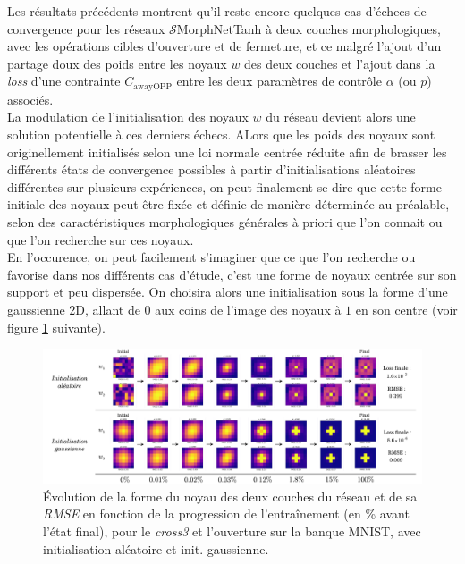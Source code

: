 Les résultats précédents montrent qu'il reste encore quelques cas d'échecs de convergence pour les réseaux $\mathcal{S}$MorphNetTanh à deux couches morphologiques, avec les opérations cibles d'ouverture et de fermeture, et ce malgré l'ajout d'un partage doux des poids entre les noyaux $w$ des deux couches et l'ajout dans la \textit{loss} d'une contrainte $C_\text{awayOPP}$ entre les deux paramètres de contrôle $\alpha$ (ou $p$) associés. \\

\vspace{-1.4mm}
\noindent La modulation de l'initialisation des noyaux $w$ du réseau devient alors une solution potentielle à ces derniers échecs. ALors que les poids des noyaux sont originellement initialisés selon une loi normale centrée réduite afin de brasser les différents états de convergence possibles à partir d'initialisations aléatoires différentes sur plusieurs expériences, on peut finalement se dire que cette forme initiale des noyaux peut être fixée et définie de manière déterminée au préalable, selon des caractéristiques morphologiques générales à priori que l'on connait ou que l'on recherche sur ces noyaux. \\

\vspace{-1.4mm}
\noindent En l'occurence, on peut facilement s'imaginer que ce que l'on recherche ou favorise dans nos différents cas d'étude, c'est une forme de noyaux centrée sur son support et peu dispersée. On choisira alors une initialisation sous la forme d'une gaussienne 2D, allant de $0$ aux coins de l'image des noyaux à $1$ en son centre (voir figure \ref{fig:init_gauss} suivante). \\


\vspace{-1.0mm}
\begin{figure}[htp]
  \begin{center}
    \includegraphics[width=1.00\linewidth]{parts/3-contributions/D-modulation_de_l_initialisation/figures/k_gauss.pdf}
    \vspace{-4.0mm}
    \caption{ \centering Évolution de la forme du noyau des deux couches du réseau et de sa \textit{RMSE} en fonction de la progression de l'entraînement (en \% avant l'état final), pour le \textit{cross3} et l'ouverture sur la banque MNIST, avec initialisation aléatoire et init. gaussienne.}
    \label{fig:init_gauss}
  \end{center}
\end{figure}


